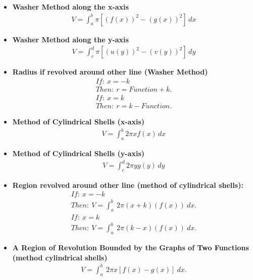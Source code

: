 \documentclass{report}
\begin{document}
\begin{itemize}
        \item \textbf{Washer Method along the x-axis}
            \begin{align}
                V = \int_{a}^{b} \pi [(f(x))^2 - (g(x))^2] \, dx
            \end{align}

        \item \textbf{Washer Method along the y-axis}
            \begin{align}
                V = \int_{c}^{d} \pi [(u(y))^2 - (v(y))^2] \, dy
            \end{align}

        \item \textbf{Radius if revolved around other line (Washer Method)}
            \begin{align*}
                If:\ x=-k\\
                Then:\ r = Function + k
            .\end{align*}
            \begin{align*}
                If:\ x=k\\
                Then:\ r = k - Function
            .\end{align*}

        \item \textbf{Method of Cylindrical Shells (x-axis)}
            \begin{align}
                V = \int_{a}^{b} 2\pi x f(x) \, dx
            \end{align}

        \item \textbf{Method of Cylindrical Shells (y-axis)}
            \begin{align}
                V = \int_{c}^{d} 2\pi y g(y) \, dy
            \end{align}

        \item \textbf{Region revolved around other line (method of cylindrical shells):}
            \begin{align*}
                If:\ x=-k \\
                Then:\ V = \int_{a}^{b}\ 2\pi (x+k)(f(x))\ dx
            .\end{align*}
            \begin{align*}
                If:\ x=k \\
                Then:\ V = \int_{a}^{b}\ 2\pi (k-x)(f(x))\ dx
            .\end{align*}
        \item \textbf{A Region of Revolution Bounded by the Graphs of Two Functions (method cylindrical shells)}
            \begin{align*}
                V = \int_{a}^{b}\ 2\pi x\left[f(x)-g(x)\right]\ dx
            .\end{align*}


\end{itemize}
\end{document}
